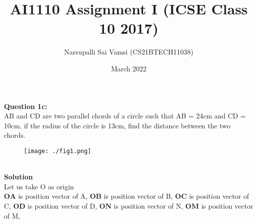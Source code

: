 \documentclass[journal,12pt,twocolumn]{IEEEtran}
\begin{document}
\makeatletter
{}
\makeatother
\let\StandardTheFigure\thefigure
\let\vec\mathbf
\renewcommand{\thefigure}{\theproblem}
\def\putbox#1#2#3{\makebox[0in][l]{\makebox[#1][l]{}\raisebox{\baselineskip}[0in][0in]{\raisebox{#2}[0in][0in]{#3}}}}
     \def\rightbox#1{\makebox[0in][r]{#1}}
     \def\centbox#1{\makebox[0in]{#1}}
     \def\topbox#1{\raisebox{-\baselineskip}[0in][0in]{#1}}
     \def\midbox#1{\raisebox{-0.5\baselineskip}[0in][0in]{#1}}
\vspace{3cm}
\title{AI1110 Assignment I (ICSE Class 10 2017)}
\author{Narsupalli Sai Vamsi (CS21BTECH11038)}
\date{March 2022}

\maketitle
\textbf{Question 1c:} \\
AB and CD are two parallel chords of a circle such that 
AB = 24cm and CD = 10cm. if the radius of the circle is 13cm,
find the distance between the two chords.
\begin{figure}
    \centering
    \texttt{[image: ./fig1.png]}
    \caption{}
    \label{fig:1}
\end{figure} \\
\textbf{Solution} \\
Let us take O as origin \\
$\vec{OA}$ is position vector of A, $\vec{OB}$ is position vector of B,
$\vec{OC}$ is position vector of C, $\vec{OD}$ is position vector of D,
$\vec{ON}$ is position vector of N, $\vec{OM}$ is position vector of M,\\
\end{document}
